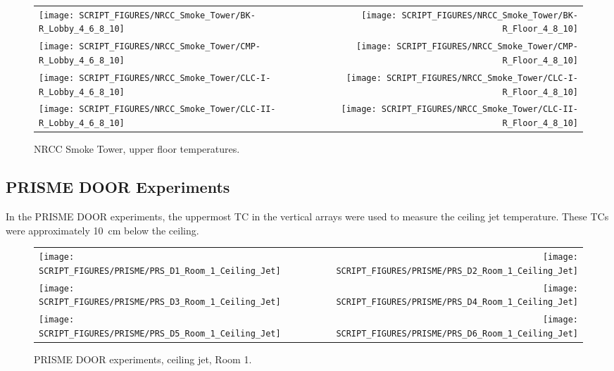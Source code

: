 \begin{figure}[p]
\begin{tabular*}{\textwidth}{l@{\extracolsep{\fill}}r}
\texttt{[image: SCRIPT\_FIGURES/NRCC\_Smoke\_Tower/BK-R\_Lobby\_4\_6\_8\_10]} &
\texttt{[image: SCRIPT\_FIGURES/NRCC\_Smoke\_Tower/BK-R\_Floor\_4\_8\_10]} \\
\texttt{[image: SCRIPT\_FIGURES/NRCC\_Smoke\_Tower/CMP-R\_Lobby\_4\_6\_8\_10]} &
\texttt{[image: SCRIPT\_FIGURES/NRCC\_Smoke\_Tower/CMP-R\_Floor\_4\_8\_10]} \\
\texttt{[image: SCRIPT\_FIGURES/NRCC\_Smoke\_Tower/CLC-I-R\_Lobby\_4\_6\_8\_10]} &
\texttt{[image: SCRIPT\_FIGURES/NRCC\_Smoke\_Tower/CLC-I-R\_Floor\_4\_8\_10]} \\
\texttt{[image: SCRIPT\_FIGURES/NRCC\_Smoke\_Tower/CLC-II-R\_Lobby\_4\_6\_8\_10]} &
\texttt{[image: SCRIPT\_FIGURES/NRCC\_Smoke\_Tower/CLC-II-R\_Floor\_4\_8\_10]}
\end{tabular*}
\caption[NRCC Smoke Tower, upper floor temperatures]{NRCC Smoke Tower, upper floor temperatures.}
\label{NRCC_Smoke_Tower_Upper_Floors}
\end{figure}


\clearpage


\subsection{PRISME DOOR Experiments}

In the PRISME DOOR experiments, the uppermost TC in the vertical arrays were used to measure the ceiling jet temperature. These TCs were approximately 10~cm below the ceiling.

\begin{figure}[!h]
\begin{tabular*}{\textwidth}{l@{\extracolsep{\fill}}r}
\texttt{[image: SCRIPT\_FIGURES/PRISME/PRS\_D1\_Room\_1\_Ceiling\_Jet]} &
\texttt{[image: SCRIPT\_FIGURES/PRISME/PRS\_D2\_Room\_1\_Ceiling\_Jet]} \\
\texttt{[image: SCRIPT\_FIGURES/PRISME/PRS\_D3\_Room\_1\_Ceiling\_Jet]} &
\texttt{[image: SCRIPT\_FIGURES/PRISME/PRS\_D4\_Room\_1\_Ceiling\_Jet]} \\
\texttt{[image: SCRIPT\_FIGURES/PRISME/PRS\_D5\_Room\_1\_Ceiling\_Jet]} &
\texttt{[image: SCRIPT\_FIGURES/PRISME/PRS\_D6\_Room\_1\_Ceiling\_Jet]}
\end{tabular*}
\caption[PRISME DOOR experiments, ceiling jet, Room 1]{PRISME DOOR experiments, ceiling jet, Room 1.}
\label{PRISME_Ceiling_Jet_Room_1}
\end{figure}

